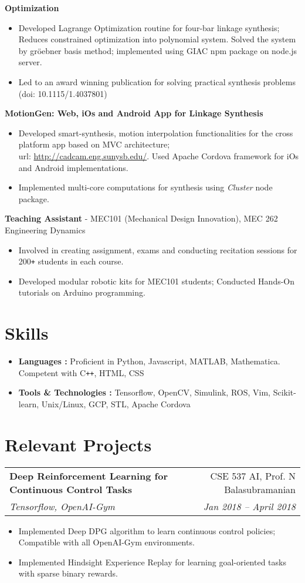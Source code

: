 \documentclass[letterpaper,10pt]{article}
\makeatletter
\newcommand{\resumeHeading}[4]{
  \vspace{-1pt}
    \begin{tabular*}{0.97\textwidth}{l@{\extracolsep{\fill}}r}
      \textbf{#1} & #2 \vspace{-2pt}\\ \vspace{1pt}
      \textit{\small#3} & \textit{\small #4} \\
    \end{tabular*}
}
\newcommand{\resumeSubheading}[1]{
      {\small\textbf{#1}} \\
}
\newcommand{\resumeSubheadingNew}[1]{
      {\small{#1}} \\
}
\newcommand{\resumeSection}[1]{
\vspace{-12pt}
\section{\textbf{#1}}
}
\newcommand{\resumeItemListStart}{
\vspace{-7pt}
\begin{itemize}[leftmargin=14pt]
}
\newcommand{\resumeItemListEnd}{
\vspace{+7pt}
\end{itemize}
}
\newcommand{\resumeItem}[1]{
  \item\small{
      {#1 \vspace{-7pt}
      }
  }
}
\makeatother
\begin{document}
      \vspace{-5pt}
      \resumeSubheading{Optimization}
      \resumeItemListStart
        \resumeItem{Developed Lagrange Optimization routine for four-bar linkage synthesis; Reduces constrained optimization into polynomial system.
          Solved the system by gr\"{o}ebner basis method; implemented using GIAC npm package on node.js server.}
        \resumeItem{Led to an award winning publication for solving practical synthesis problems (doi: 10.1115/1.4037801)}
      \resumeItemListEnd

      \vspace{-5pt}
      \resumeSubheading{MotionGen: Web, iOs and Android App for Linkage Synthesis}
      \resumeItemListStart
        \resumeItem{Developed smart-synthesis, motion interpolation functionalities for the cross platform app based on MVC architecture; \\ url: \href{http://cadcam.eng.sunysb.edu/}{http://cadcam.eng.sunysb.edu/}. Used Apache Cordova framework for iOs and Android implementations.}
        \resumeItem{Implemented multi-core computations for synthesis using \emph{Cluster} node package.}
      \resumeItemListEnd

      \vspace{-5pt}
      \resumeSubheadingNew{\textbf{Teaching Assistant} - MEC101 (Mechanical Design Innovation), MEC 262 Engineering Dynamics}
      \resumeItemListStart
        \resumeItem{Involved in creating assignment, exams and conducting recitation sessions for 200\texttt{+} students in each course.}
        \resumeItem{Developed modular robotic kits for MEC101 students; Conducted Hands-On tutorials on Arduino programming.}
      \resumeItemListEnd

\resumeSection{Skills}
\vspace{+7pt}
    \resumeItemListStart
      \resumeItem{\textbf{Languages :} Proficient in Python, Javascript, MATLAB, Mathematica. Competent with C\texttt{++}, HTML, CSS}
      \resumeItem{\textbf{Tools \& Technologies :} Tensorflow, OpenCV, Simulink, ROS, Vim, Scikit-learn, Unix/Linux, GCP, STL, Apache Cordova}
    \resumeItemListEnd


    \resumeSection{Relevant Projects}

    \resumeHeading{Deep Reinforcement Learning for Continuous Control Tasks}{CSE 537 AI, Prof. N Balasubramanian}{Tensorflow, OpenAI-Gym}{Jan 2018 -- April 2018}
    \resumeItemListStart
      \resumeItem{Implemented Deep DPG algorithm to learn continuous control policies; Compatible with all OpenAI-Gym environments.}
      \resumeItem{Implemented Hindsight Experience Replay for learning goal-oriented tasks with sparse binary rewards.}
    \resumeItemListEnd
\end{document}
